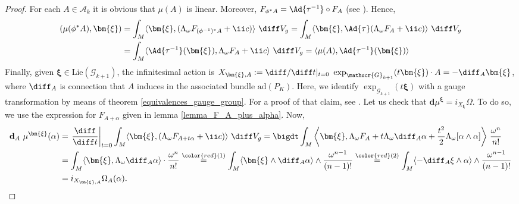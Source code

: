 \begin{proof}
    For each \(A \in \mathscr{A}_k\) it is obvious that \(\mu(A)\) is linear. Moreover, \(F_{\phi^*A}=\Ad{\tau^{-1}}\circ F_A\) (see \parencite[Page 462]{Rudolph_2017pug}). Hence,
    \begin{align*}
        (\mu(\phi^*A), \bm{\xi})  & = \int_M \langle \bm{\xi}, (\Lambda_\omega F_{(\phi^{-1})^*A}+\ii c) \rangle \ \diff V_g = \int_M \langle \bm{\xi}, \Ad{\tau}(\Lambda_\omega F_A+ \ii c) \rangle \ \diff V_g \\
        & = \int_M \langle \Ad{\tau^{-1}} (\bm{\xi}), \Lambda_\omega F_A +\ii c \rangle \ \diff V_g = \langle \mu(A), \Ad{\tau^{-1}}(\bm{\xi}) \rangle 
    \end{align*}
    Finally, given \(\bm{\xi}\in \mathrm{Lie}(\mathscr{G}_{k+1})\), the infinitesimal action is \(X_{\bm{\xi}, A}:=\diff/\diff t|_{t=0} \ \exp_{\mathscr{G}_{k+1}}(t \bm{\xi})\cdot A=-\diff_A \bm{\xi}\), where \(\diff_A\) is connection that \(A\) induces in the associated bundle \(\mathrm{ad}(P_K)\). Here, we identify \(\exp_{\mathscr{G}_{k+1}}(t \bm{\xi})\) with a gauge transformation by means of theorem \ref{equivalences_gauge_group}. For a proof of that claim, see \parencite[Lemma 2.2]{trautwein2015surveygitpictureyangmills}. Let us check that \(\mathbf{d} \mu^{\bm \xi}=i_{X_{\bm{\xi}}}\Omega\). To do so, we use the expression for \(F_{A+\alpha}\) given in lemma \ref{lemma_F_A_plus_alpha}. Now, 
    \begin{align*}
    \mathbf{d}_A \  \mu^{\bm{\xi}}(\alpha) & = \left. \frac{\diff }{\diff t} \right|_{t=0} \int_M \langle \bm{\xi}, (\Lambda_\omega F_{A+t \alpha}+\ii c) \rangle \ \diff V_g = \bigdt\int_M \bigg\langle \bm{\xi},  \Lambda_\omega F_A + t \Lambda_\omega  \diff_A \alpha +\frac{t^2}{2} \Lambda_\omega[\alpha \wedge \alpha ] \bigg\rangle \ \frac{\omega^n}{n!}   \\
    & = \int_M \langle \bm{\xi}, \Lambda_\omega \diff_A \alpha \rangle \cdot \frac{\omega^n}{n!} \overset{{\color{red}(1)}}{=}\int_M \langle \bm{\xi} \wedge \diff_A \alpha \rangle \wedge \frac{\omega^{n-1}}{(n-1)!} \overset{{\color{red}(2)}}{=} \int_M \langle -\diff_A \xi \wedge  \alpha \rangle \wedge \frac{\omega^{n-1}}{(n-1)!} \\
    & = i_{X_{\bm{\xi}, A}} \Omega_A(\alpha).
    \end{align*}

\end{proof}
